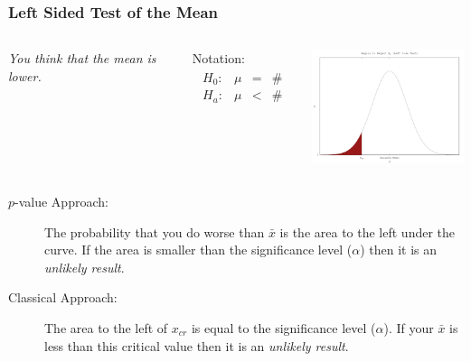 \begin{frame}
  \frametitle{Left Sided Test of the Mean}

  \begin{columns}
    \textit{You think that the mean is lower.}

    Notation:
    \begin{eqnarray*}
      \begin{array}{lrcl}
        H_0: & \mu & = & \# \\
        H_a: & \mu & < & \#
      \end{array}
    \end{eqnarray*}


    \includegraphics[width=5cm]{img/leftSideHypothesisTest}

  \end{columns}

  \begin{description}
  \item[$p$-value Approach:] The probability that you do worse than
    $\bar{x}$ is the area to the left under the curve. If the area is
    smaller than the significance level ($\alpha$) then it is an
    \textit{unlikely result}.
  \item[Classical Approach:] The area to the left of $x_{cr}$ is
    equal to the significance level ($\alpha$). If your $\bar{x}$ is
    less than this critical value then it is an \textit{unlikely
      result}.
  \end{description}


\end{frame}

